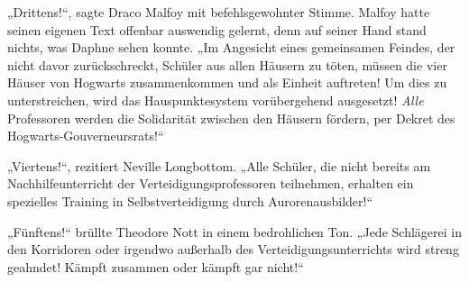 „Drittens!“, sagte Draco Malfoy mit befehlsgewohnter Stimme. Malfoy hatte seinen eigenen Text offenbar auswendig gelernt, denn auf seiner Hand stand nichts, was Daphne sehen konnte. „Im Angesicht eines gemeinsamen Feindes, der nicht davor zurückschreckt, Schüler aus allen Häusern zu töten, müssen die vier Häuser von Hogwarts zusammenkommen und als Einheit auftreten! Um dies zu unterstreichen, wird das Hauspunktesystem vorübergehend ausgesetzt! \emph{Alle} Professoren werden die Solidarität zwischen den Häusern fördern, per Dekret des Hogwarts-Gouverneursrats!“

„Viertens!“, rezitiert Neville Longbottom. „Alle Schüler, die nicht bereits am Nachhilfeunterricht der Verteidigungsprofessoren teilnehmen, erhalten ein spezielles Training in Selbstverteidigung durch Aurorenausbilder!“

„Fünftens!“ brüllte Theodore Nott in einem bedrohlichen Ton. „Jede Schlägerei in den Korridoren oder irgendwo außerhalb des Verteidigungsunterrichts wird streng geahndet! Kämpft zusammen oder kämpft gar nicht!“

